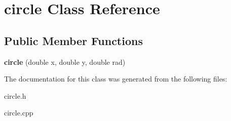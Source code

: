 \hypertarget{classcircle}{}\section{circle Class Reference}
\label{classcircle}
\subsection*{Public Member Functions}
\begin{DoxyCompactItemize}
\item 
\mbox{\label{classcircle_a0a7895011a68519c1d3dd414ea2877e5}} 
{\bfseries circle} (double x, double y, double rad)
\end{DoxyCompactItemize}


The documentation for this class was generated from the following files\+:\begin{DoxyCompactItemize}
\item 
circle.\+h\item 
circle.\+cpp\end{DoxyCompactItemize}
